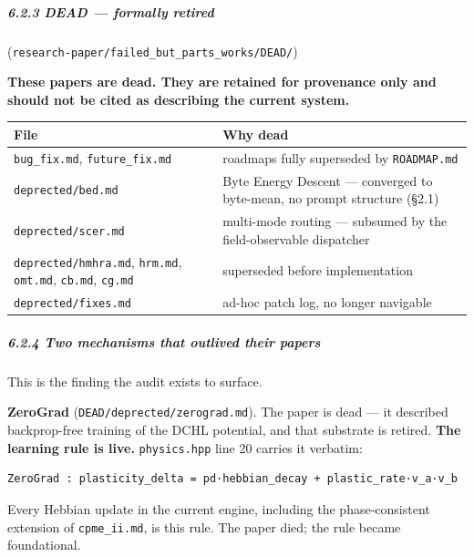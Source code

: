 \documentclass[
  11pt,
  a4paper,
]{article}
\begin{document}
\subparagraph{6.2.3 DEAD --- formally
retired}\label{dead-formally-retired}

(\texttt{research-paper/failed\_but\_parts\_works/DEAD/})

\textbf{These papers are dead. They are retained for provenance only and
should not be cited as describing the current system.}

\begin{longtable}[]{@{}
  >{\raggedright\arraybackslash}p{}
  >{\raggedright\arraybackslash}p{}@{}}
\toprule\noalign{}
\begin{minipage}[b]{\linewidth}\raggedright
File
\end{minipage} & \begin{minipage}[b]{\linewidth}\raggedright
Why dead
\end{minipage} \\
\midrule\noalign{}
\endhead
\bottomrule\noalign{}
\endlastfoot
\texttt{bug\_fix.md}, \texttt{future\_fix.md} & roadmaps fully
superseded by \texttt{ROADMAP.md} \\
\texttt{deprected/bed.md} & Byte Energy Descent --- converged to
byte-mean, no prompt structure (§2.1) \\
\texttt{deprected/scer.md} & multi-mode routing --- subsumed by the
field-observable dispatcher \\
\texttt{deprected/hmhra.md}, \texttt{hrm.md}, \texttt{omt.md},
\texttt{cb.md}, \texttt{cg.md} & superseded before implementation \\
\texttt{deprected/fixes.md} & ad-hoc patch log, no longer navigable \\
\end{longtable}

\subparagraph{6.2.4 Two mechanisms that outlived their
papers}\label{two-mechanisms-that-outlived-their-papers}

This is the finding the audit exists to surface.

\textbf{ZeroGrad} (\texttt{DEAD/deprected/zerograd.md}). The paper is
dead --- it described backprop-free training of the DCHL potential, and
that substrate is retired. \textbf{The learning rule is live.}
\texttt{physics.hpp} line 20 carries it verbatim:

\begin{verbatim}
ZeroGrad : plasticity_delta = pd·hebbian_decay + plastic_rate·v_a·v_b
\end{verbatim}

Every Hebbian update in the current engine, including the
phase-consistent extension of \texttt{cpme\_ii.md}, is this rule. The
paper died; the rule became foundational.
\end{document}
